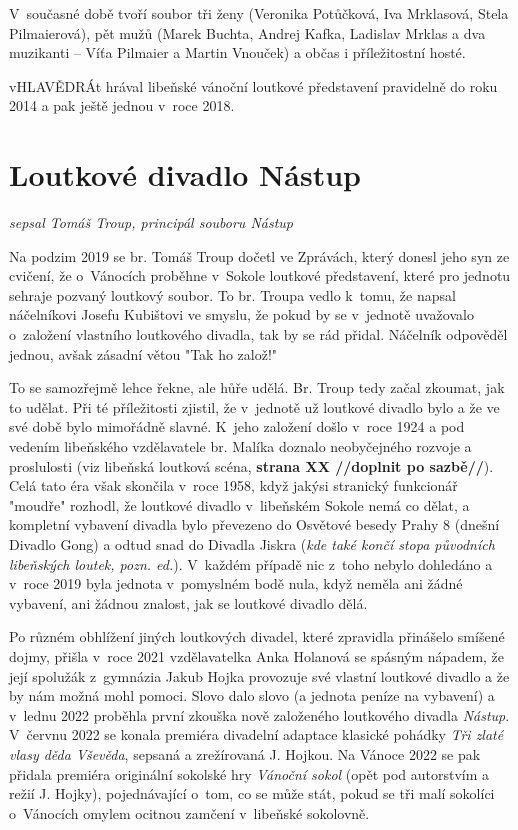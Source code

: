 \documentclass[a5paper, 11pt, twoside]{article}
\begin{document}
V~současné době tvoří soubor tři ženy (Veronika Potůčková, Iva
Mrklasová, Stela Pilmaierová), pět mužů (Marek Buchta, Andrej Kafka,
Ladislav Mrklas a dva muzikanti -- Víťa Pilmaier a Martin Vnouček) a
občas i příležitostní hosté.

vHLAVĚDRÁt hrával libeňské vánoční loutkové představení pravidelně do
roku 2014 a pak ještě jednou v~roce 2018.

\section{Loutkové divadlo Nástup}

\textit{sepsal Tomáš Troup, principál souboru Nástup}

Na podzim 2019 se br. Tomáš Troup dočetl ve Zprávách, který donesl jeho
syn ze cvičení, že o~Vánocích proběhne v~Sokole loutkové představení,
které pro jednotu sehraje pozvaný loutkový soubor. To br. Troupa vedlo
k~tomu, že napsal náčelníkovi Josefu Kubištovi ve smyslu, že pokud by se
v~jednotě uvažovalo o~založení vlastního loutkového divadla, tak by se rád
přidal. Náčelník odpověděl jednou, avšak zásadní větou "Tak ho
založ!{}"

To se samozřejmě lehce řekne, ale hůře udělá. Br. Troup tedy začal
zkoumat, jak to udělat. Při té příležitosti zjistil, že v~jednotě už
loutkové divadlo bylo a že ve své době bylo mimořádně slavné. K~jeho
založení došlo v~roce 1924 a pod vedením libeňského vzdělavatele br.
Malíka doznalo neobyčejného rozvoje a proslulosti (viz libeňská loutková
scéna, \textbf{strana XX //doplnit po sazbě//}). Celá tato éra však skončila
v~roce 1958, když jakýsi stranický funkcionář "moudře" rozhodl, že
loutkové divadlo v~libeňském Sokole nemá co dělat, a kompletní vybavení
divadla bylo převezeno do Osvětové besedy Prahy 8 (dnešní Divadlo Gong)
a odtud snad do Divadla Jiskra (\textit{kde také končí stopa původních
libeňských loutek, pozn. ed.}). V~každém případě nic z~toho nebylo
dohledáno a v~roce 2019 byla jednota v~pomyslném bodě nula, když neměla
ani žádné vybavení, ani žádnou znalost, jak se loutkové divadlo dělá.

Po různém obhlížení jiných loutkových divadel, které zpravidla přinášelo
smíšené dojmy, přišla v~roce 2021 vzdělavatelka Anka Holanová se spásným
nápadem, že její spolužák z~gymnázia Jakub Hojka provozuje své vlastní
loutkové divadlo a že by nám možná mohl pomoci. Slovo dalo slovo (a
jednota peníze na vybavení) a v~lednu 2022 proběhla první zkouška nově
založeného loutkového divadla \textit{Nástup}. V~červnu 2022 se konala
premiéra divadelní adaptace klasické pohádky \textit{Tři zlaté vlasy děda
Vševěda}, sepsaná a zrežírovaná J. Hojkou. Na Vánoce 2022 se pak přidala
premiéra originální sokolské hry \textit{Vánoční sokol} (opět pod
autorstvím a režií J. Hojky), pojednávající o~tom, co se může stát,
pokud se tři malí sokolíci o~Vánocích omylem ocitnou zamčení v~libeňské
sokolovně.
\end{document}
